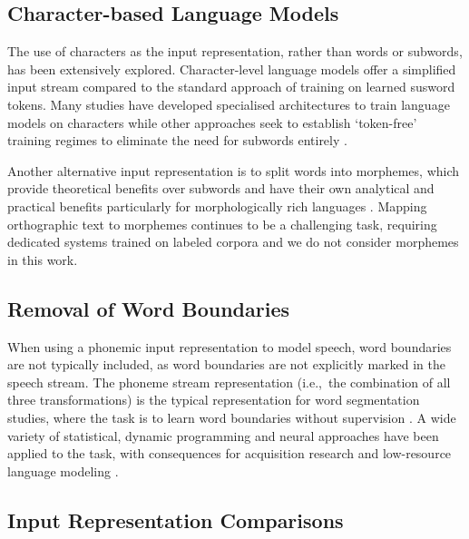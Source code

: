 \subsection{Character-based Language Models}

The use of characters as the input representation, rather than words or subwords, has been extensively explored. Character-level language models offer a simplified input stream compared to the standard approach of training on learned susword tokens. Many studies have developed specialised architectures to train language models on characters \citep{jozefowicz2016exploringlimitslanguagemodeling, kim2016character, ma-etal-2020-charbert, al-rfou_character-level_2019} while other approaches seek to establish `token-free' training regimes to eliminate the need for subwords entirely \citep{clark-etal-2022-canine, xue-2022-byt5}.

Another alternative input representation is to split words into morphemes, which provide theoretical benefits over subwords and have their own analytical and practical benefits particularly for morphologically rich languages \citep{ustun-etal-2018-characters, nzeyimana-niyongabo-rubungo-2022-kinyabert, fan-sun-2023-constructivist}. Mapping orthographic text to morphemes continues to be a challenging task, requiring dedicated systems trained on labeled corpora \citep{batsuren-etal-2022-sigmorphon} and we do not consider morphemes in this work.

\subsection{Removal of Word Boundaries}

When using a phonemic input representation to model speech, word boundaries are not typically included, as word boundaries are not explicitly marked in the speech stream. The phoneme stream representation (i.e.,\ the combination of all three transformations) is the typical representation for word segmentation studies, where the task is to learn word boundaries without supervision \citep{Brent1999}. A wide variety of statistical, dynamic programming and neural approaches have been applied to the task, with consequences for acquisition research and low-resource language modeling \citep{Blanchard2010, Coltekin2017, algayres_dp-parse_2022, goriely2023word}.

\subsection{Input Representation Comparisons}

